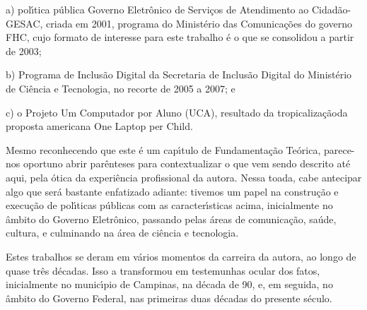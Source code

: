 \documentclass[
12pt,		%
openright,	%
twoside,  %
a4paper,			%
chapter=TITLE,		%
english,			%
french,				%
spanish,			%
brazil				%
]{USPSC-classe/USPSC}
\begin{document}
\begin{alineas}
\item a) pol\'{\i}tica p\'ublica \textquotedbl Governo Eletr\^onico de Servi\c{c}os de Atendimento ao Cidad\~ao-GESAC\textquotedbl , criada em 2001, programa do Minist\'erio das Comunica\c{c}\~oes do governo FHC, cujo formato de interesse para este trabalho \'e o que se consolidou a partir de 2003;

\item b) Programa de Inclus\~ao Digital da Secretaria de Inclus\~ao Digital do Minist\'erio de Ci\^encia e Tecnologia, no recorte de 2005 a 2007; e
\item c) o Projeto Um Computador por Aluno (UCA), resultado da \textquotedbl tropicaliza\c{c}\~ao\textquotedbl  da proposta americana \textquotedbl One Laptop per Child\textquotedbl .
\end{alineas}

Mesmo reconhecendo que este \'e um cap\'{\i}tulo de Fundamenta\c{c}\~ao Te\'orica, parece-nos oportuno abrir par\^enteses para contextualizar o que vem sendo descrito at\'e aqui, pela \'otica da experi\^encia profissional da autora. Nessa toada, cabe antecipar algo que ser\'a bastante enfatizado adiante: tivemos um papel na constru\c{c}\~ao e execu\c{c}\~ao de pol\'{\i}ticas p\'ublicas com as caracter\'{\i}sticas acima, inicialmente no \^ambito do Governo Eletr\^onico, passando pelas \'areas de comunica\c{c}\~ao, sa\'ude, cultura, e culminando na \'area de ci\^encia e tecnologia.

















Estes trabalhos se deram em v\'arios momentos da carreira da autora, ao longo de quase tr\^es d\'ecadas. Isso a transformou em testemunhas ocular dos fatos, inicialmente no  munic\'{\i}pio de Campinas, na d\'ecada de 90, e, em seguida, no \^ambito do Governo Federal, nas primeiras duas d\'ecadas do presente s\'eculo.
\end{document}
